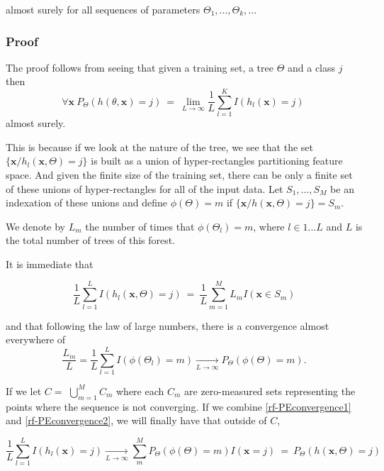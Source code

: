 almost surely for all sequences of parameters $\Theta_1, ..., \Theta_k,...$

\subsubsection{Proof}
The proof follows from seeing that given a training set, a tree $\Theta$ and a class $j$ then
$$\forall \textbf{x}   \ P_\Theta(h(\theta,\textbf{x}) = j) \ = \
\lim_{L\to\infty} \frac{1}{L} \sum_{l=1}^K I(h_l(\textbf{x}) = j) \  $$
almost surely.

This is because if we look at the nature of the tree, we see that the set $\{\textbf{x} / h_l(\textbf{x}, \Theta) = j \}$ is built as a union of hyper-rectangles partitioning feature space. And given the finite size of the training set, there can be only a finite set of these unions of hyper-rectangles for all of the input data. Let $S_1, ..., S_M$ be an indexation of these unions and define $\phi(\Theta) = m $ if $\{\textbf{x} / h(\textbf{x}, \Theta) = j \} = S_m$.

We denote by $L_m$ the number of times that $\phi(\Theta_l) =m $, where $l \in {1...L}$ and $L$ is the total number of trees of this forest.

It is immediate that

\begin{equation}\label{rf-PEconvergence1}
\frac{1}{L} \sum_{l=1}^L I(h_l(\textbf{x},\Theta) = j) \ = \  \frac{1}{L} \sum_{m=1}^M L_m I(\textbf{x} \in S_m)
\end{equation}

and that following the law of large numbers, there is a convergence almost everywhere of
\begin{equation} \label{rf-PEconvergence2}
\frac{L_m}{L} = \frac{1}{L} \sum_{l=1}^L  I(\phi(\Theta_l) = m)  \xrightarrow[L \to \infty]{}   P_{\Theta}(\phi(\Theta)= m).
\end{equation}

If we let $C = $ $\bigcup\limits_{m=1}^{M} C_{m}$ where each $C_m$ are zero-measured sets representing the points where the sequence is not converging.  If we combine \ref{rf-PEconvergence1} and \ref{rf-PEconvergence2}, we will finally have that  outside of $C$,

$$ \frac{1}{L} \sum_{l=1}^L I(h_l(\textbf{x}) = j) \xrightarrow[L \to \infty]{} \sum_m^M    P_{\Theta}(\phi(\Theta)= m) I(\textbf{x} =j ) \ = \ P_{\Theta}(h(\textbf{x}, \Theta) = j)  $$



